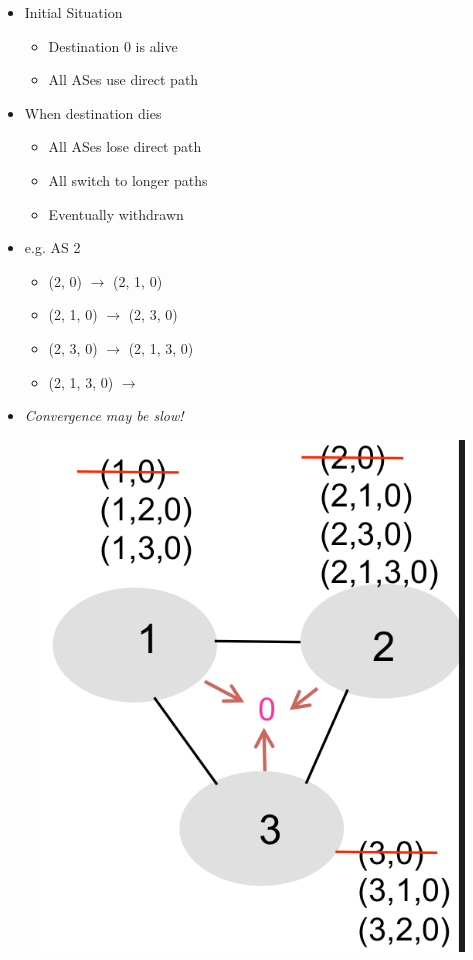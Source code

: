 \begin{itemize}
    \item Initial Situation
          \begin{itemize}
              \item Destination 0 is alive
              \item All ASes use direct path
          \end{itemize}
    \item When destination dies
          \begin{itemize}
              \item All ASes lose direct path
              \item All switch to longer paths
              \item Eventually withdrawn
          \end{itemize}
    \item e.g. AS 2
          \begin{itemize}
              \item (2, 0) $\rightarrow$ (2, 1, 0)
              \item (2, 1, 0) $\rightarrow$ (2, 3, 0)
              \item (2, 3, 0) $\rightarrow$ (2, 1, 3, 0)
              \item (2, 1, 3, 0) $\rightarrow$ \Null
          \end{itemize}
    \item \emph{Convergence may be slow!}
\end{itemize}
\begin{figure}[H]
    \includegraphics[scale=0.25]{lazy/routingpathexploration2.png}
\end{figure}

